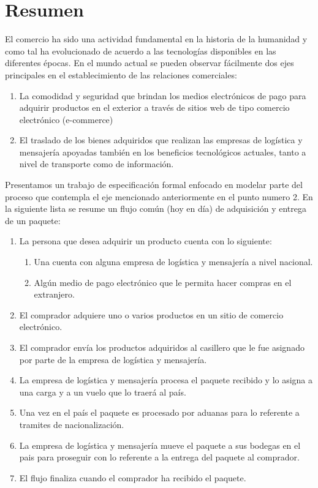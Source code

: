 \documentclass[12pt,a4paper,zed]{article}
\begin{document}
\section{Resumen}
El comercio ha sido una actividad fundamental en la historia de la humanidad y como tal ha evolucionado de acuerdo a las tecnologías disponibles en las diferentes épocas. 
En el mundo actual se pueden observar fácilmente dos ejes principales en el establecimiento de las relaciones comerciales: 
\begin{enumerate}
\item La comodidad y seguridad que brindan los medios electrónicos de pago para adquirir productos en el exterior a través de sitios web de tipo comercio electrónico (e-commerce)
\item El traslado de los bienes adquiridos que realizan las empresas de logística y mensajería apoyadas también en los beneficios tecnológicos actuales, tanto a nivel de transporte como de información.
\end{enumerate}
Presentamos un trabajo de especificación formal enfocado en modelar parte del proceso que contempla el eje mencionado anteriormente en el punto numero 2. En la siguiente lista se resume un flujo común (hoy en día) de adquisición y entrega de un paquete:
\begin{enumerate}
\item La persona que desea adquirir un producto cuenta con lo siguiente:
\begin{enumerate}
\item Una cuenta con alguna empresa de logística y mensajería a nivel nacional.
\item Algún medio de pago electrónico que le permita hacer compras en el extranjero.
\end{enumerate}
\item El comprador adquiere uno o varios productos en un sitio de comercio electrónico.
\item El comprador envía los productos adquiridos al casillero que le fue asignado por parte de la empresa de logística y mensajería.
\item La empresa de logística y mensajería procesa el paquete recibido y lo asigna a una carga y a un vuelo que lo traerá al país.
\item Una vez en el país el paquete es procesado por aduanas para lo referente a tramites de nacionalización.
\item La empresa de logística y mensajería mueve el paquete a sus bodegas en el pais para proseguir con lo referente a la entrega del paquete al comprador.
\item El flujo finaliza cuando el comprador ha recibido el paquete.
\end{enumerate}
\end{document}
